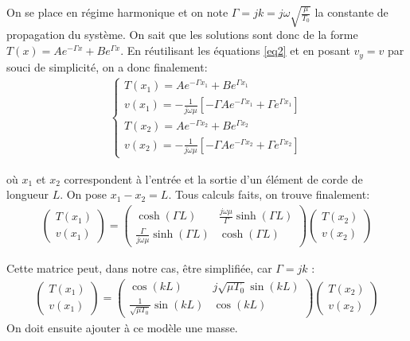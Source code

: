 \documentclass[a4paper,11pt]{report} %
\begin{document}
On se place en régime harmonique et on note $\Gamma = jk = j\omega\sqrt{\frac{\mu}{T_0}}$ la constante de propagation du système. On sait que les solutions sont donc de la forme $T(x) = A e^{-\Gamma x} + B e^{\Gamma x}$. En réutilisant les équations \ref{eq2} et en posant $v_y=v$ par souci de simplicité, on a donc finalement:
\begin{eqnarray*}
\begin{cases}
T(x_1)  =  A e^{-\Gamma x_1} + B e^{\Gamma x_1} \\
v(x_1)  =  -\frac{1}{j\omega\mu} [ -\Gamma A e^{-\Gamma x_1} + \Gamma e^{\Gamma x_1}]\\
T(x_2)  =  A e^{-\Gamma x_2} + B e^{\Gamma x_2} \\
v(x_2)  =  -\frac{1}{j\omega\mu} [ -\Gamma A e^{-\Gamma x_2} + \Gamma e^{\Gamma x_2}]
\end{cases}
\end{eqnarray*}

où $x_1$ et $x_2$ correspondent à l'entrée et la sortie d'un élément de corde de longueur $L$. 
On pose $x_1 - x_2 = L$. Tous calculs faits, on trouve finalement:
\begin{eqnarray*}
\begin{pmatrix} T(x_1) \\ v(x_1) \end{pmatrix} = \begin{pmatrix} \cosh(\Gamma L) & \frac{j\omega\mu}{\Gamma} \sinh(\Gamma L) \\  \frac{\Gamma}{j\omega\mu}\sinh(\Gamma L) & \cosh(\Gamma L) \end{pmatrix} \begin{pmatrix} T(x_2) \\ v(x_2) \end{pmatrix}
\end{eqnarray*}

Cette matrice peut, dans notre cas, être simplifiée, car $\Gamma = jk$ :
\begin{eqnarray*}
\begin{pmatrix} T(x_1) \\ v(x_1) \end{pmatrix} = \begin{pmatrix} \cos(k L) & j \sqrt{\mu T_0} \sin(k L) \\ \frac{1}{\sqrt{\mu T_0}} \sin(k L) & \cos(k L) \end{pmatrix} \begin{pmatrix} T(x_2)\\ v(x_2) \end{pmatrix}
\end{eqnarray*}
On doit ensuite ajouter à ce modèle une masse.
\end{document}
